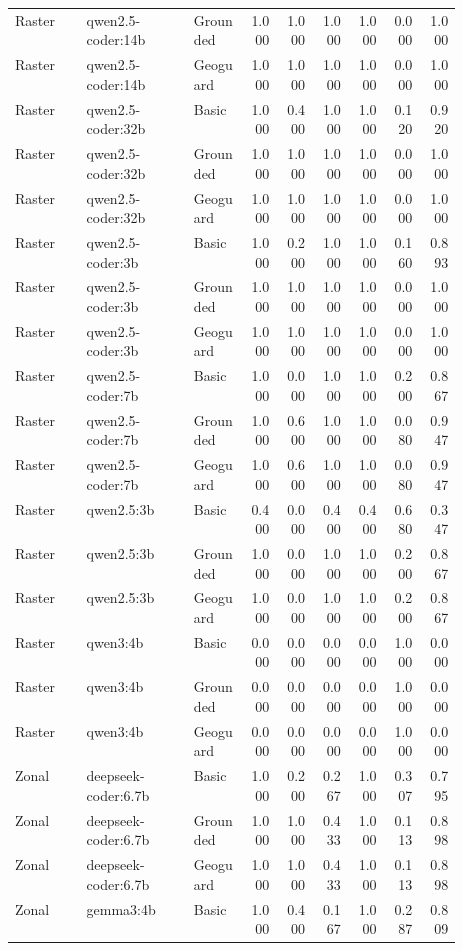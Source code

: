 \begin{longtable}{p{0.16\linewidth}p{0.24\linewidth}p{0.12\linewidth}rrrrrr}
Raster & qwen2.5-coder:14b & Grounded & 1.000 & 1.000 & 1.000 & 1.000 & 0.000 & 1.000 \\
Raster & qwen2.5-coder:14b & Geoguard & 1.000 & 1.000 & 1.000 & 1.000 & 0.000 & 1.000 \\
Raster & qwen2.5-coder:32b & Basic & 1.000 & 0.400 & 1.000 & 1.000 & 0.120 & 0.920 \\
Raster & qwen2.5-coder:32b & Grounded & 1.000 & 1.000 & 1.000 & 1.000 & 0.000 & 1.000 \\
Raster & qwen2.5-coder:32b & Geoguard & 1.000 & 1.000 & 1.000 & 1.000 & 0.000 & 1.000 \\
Raster & qwen2.5-coder:3b & Basic & 1.000 & 0.200 & 1.000 & 1.000 & 0.160 & 0.893 \\
Raster & qwen2.5-coder:3b & Grounded & 1.000 & 1.000 & 1.000 & 1.000 & 0.000 & 1.000 \\
Raster & qwen2.5-coder:3b & Geoguard & 1.000 & 1.000 & 1.000 & 1.000 & 0.000 & 1.000 \\
Raster & qwen2.5-coder:7b & Basic & 1.000 & 0.000 & 1.000 & 1.000 & 0.200 & 0.867 \\
Raster & qwen2.5-coder:7b & Grounded & 1.000 & 0.600 & 1.000 & 1.000 & 0.080 & 0.947 \\
Raster & qwen2.5-coder:7b & Geoguard & 1.000 & 0.600 & 1.000 & 1.000 & 0.080 & 0.947 \\
Raster & qwen2.5:3b & Basic & 0.400 & 0.000 & 0.400 & 0.400 & 0.680 & 0.347 \\
Raster & qwen2.5:3b & Grounded & 1.000 & 0.000 & 1.000 & 1.000 & 0.200 & 0.867 \\
Raster & qwen2.5:3b & Geoguard & 1.000 & 0.000 & 1.000 & 1.000 & 0.200 & 0.867 \\
Raster & qwen3:4b & Basic & 0.000 & 0.000 & 0.000 & 0.000 & 1.000 & 0.000 \\
Raster & qwen3:4b & Grounded & 0.000 & 0.000 & 0.000 & 0.000 & 1.000 & 0.000 \\
Raster & qwen3:4b & Geoguard & 0.000 & 0.000 & 0.000 & 0.000 & 1.000 & 0.000 \\
Zonal & deepseek-coder:6.7b & Basic & 1.000 & 0.200 & 0.267 & 1.000 & 0.307 & 0.795 \\
Zonal & deepseek-coder:6.7b & Grounded & 1.000 & 1.000 & 0.433 & 1.000 & 0.113 & 0.898 \\
Zonal & deepseek-coder:6.7b & Geoguard & 1.000 & 1.000 & 0.433 & 1.000 & 0.113 & 0.898 \\
Zonal & gemma3:4b & Basic & 1.000 & 0.400 & 0.167 & 1.000 & 0.287 & 0.809 \\

\end{longtable}
